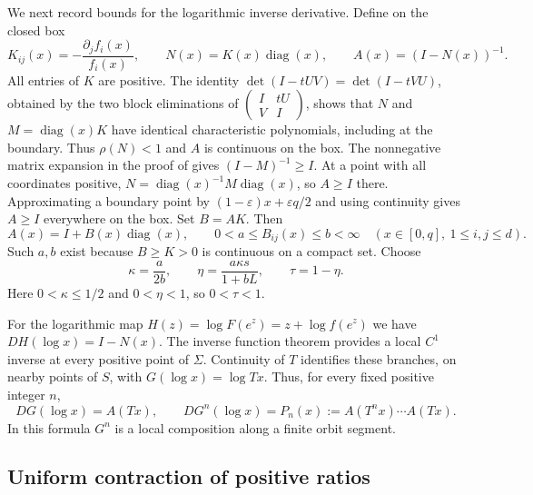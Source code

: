 \documentclass[11pt]{article}
\newcommand{\diag}{\operatorname{diag}}
\begin{document}
We next record bounds for the logarithmic inverse derivative. Define on
the closed box
\begin{equation}\label{eq:matrices}
 K_{ij}(x)=-\frac{\partial_j f_i(x)}{f_i(x)},\qquad
 N(x)=K(x)\diag(x),\qquad A(x)=(I-N(x))^{-1}.
\end{equation}
All entries of $K$ are positive. The identity
$\det(I-tUV)=\det(I-tVU)$, obtained by the two block eliminations of
$\left(\begin{smallmatrix}I&tU\\V&I\end{smallmatrix}\right)$,
shows that $N$ and $M=\diag(x)K$ have identical characteristic polynomials,
including at the boundary. Thus $\rho(N)<1$ and $A$ is continuous on the
box. The nonnegative matrix expansion in the proof of
\cite[Lemma~15]{Baigent} gives $(I-M)^{-1}\geq I$.
At a point with all coordinates positive,
$N=\diag(x)^{-1}M\diag(x)$, so $A\geq I$ there. Approximating a boundary
point by $(1-\varepsilon)x+\varepsilon q/2$ and using continuity gives
$A\geq I$ everywhere on the box.
Set $B=AK$. Then
\begin{equation}\label{eq:columns}
 A(x)=I+B(x)\diag(x),\qquad
 0<a\leq B_{ij}(x)\leq b<\infty
 \quad(x\in[0,q],\ 1\leq i,j\leq d).
\end{equation}
Such $a,b$ exist because $B\geq K>0$ is continuous on a compact set.
Choose
\begin{equation}\label{eq:constants}
 \kappa=\frac{a}{2b},\qquad
 \eta=\frac{a\kappa s}{1+bL},\qquad \tau=1-\eta.
\end{equation}
Here $0<\kappa\leq1/2$ and $0<\eta<1$, so $0<\tau<1$.

For the logarithmic map
$H(z)=\log F(e^z)=z+\log f(e^z)$ we have
$DH(\log x)=I-N(x)$. The inverse function theorem provides a local $C^1$
inverse at every positive point of $\Sigma$. Continuity of $T$ identifies
these branches, on nearby points of $S$, with
$G(\log x)=\log Tx$. Thus, for every fixed positive integer $n$,
\begin{equation}\label{eq:inverse-product}
 DG(\log x)=A(Tx),\qquad
 DG^n(\log x)=P_n(x):=A(T^nx)\cdots A(Tx).
\end{equation}
In this formula $G^n$ is a local composition along a finite orbit segment.

\subsection{Uniform contraction of positive ratios}
\end{document}
